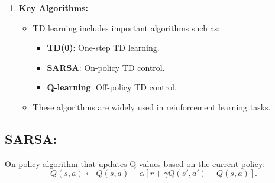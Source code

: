 \documentclass[12pt,a4paper]{article}
\begin{document}
\begin{enumerate}
    \item \textbf{Key Algorithms:}
    \begin{itemize}
        \item TD learning includes important algorithms such as:
        \begin{itemize}
            \item \textbf{TD(0)}: One-step TD learning.
            \item \textbf{SARSA}: On-policy TD control.
            \item \textbf{Q-learning}: Off-policy TD control.
        \end{itemize}
        \item These algorithms are widely used in reinforcement learning tasks.
    \end{itemize}
\end{enumerate}
\subsection{SARSA:} On-policy algorithm that updates Q-values based on the current policy:
    \[ Q(s, a) \leftarrow Q(s, a) + \alpha \left[ r + \gamma Q(s', a') - Q(s, a) \right]. \]
\end{document}
